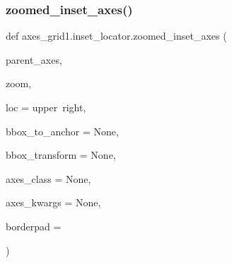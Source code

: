 \subsubsection{\texorpdfstring{zoomed\+\_\+inset\+\_\+axes()}{zoomed\_inset\_axes()}}
{\footnotesize\ttfamily def axes\+\_\+grid1.\+inset\+\_\+locator.\+zoomed\+\_\+inset\+\_\+axes (\begin{DoxyParamCaption}\item[{}]{parent\+\_\+axes,  }\item[{}]{zoom,  }\item[{}]{loc = {\ttfamily \textquotesingle{}upper~right\textquotesingle{}},  }\item[{}]{bbox\+\_\+to\+\_\+anchor = {\ttfamily None},  }\item[{}]{bbox\+\_\+transform = {\ttfamily None},  }\item[{}]{axes\+\_\+class = {\ttfamily None},  }\item[{}]{axes\+\_\+kwargs = {\ttfamily None},  }\item[{}]{borderpad = {} }\end{DoxyParamCaption})}

